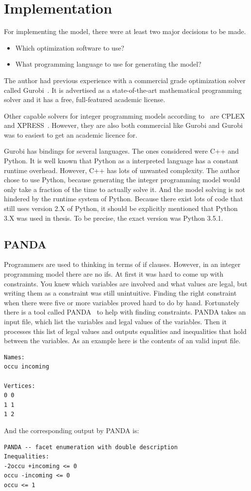 \section{Implementation}
For implementing the model, there were at least two major decisions to be made.
\begin{itemize}
    \item Which optimization software to use?
    \item What programming language to use for generating the model?
\end{itemize}
The author had previous experience with a commercial grade optimization solver
called Gurobi~\cite{gurobi}. It is advertised as a state-of-the-art
mathematical programming solver and it has a free, full-featured academic
license.

Other capable solvers for integer programming models according
to~\cite{meindl2012analysis,mittleman} are CPLEX~\cite{cplex} and XPRESS~\cite{xpress}.
However, they are also both commercial like Gurobi and Gurobi was to easiest to
get an academic licence for.

Gurobi has bindings for several languages. The ones considered were C++ and
Python. It is well known that Python as a interpreted language has a constant
runtime overhead. However, C++ has lots of unwanted complexity. The author
chose to use Python, because generating the integer programming model would
only take a fraction of the time to actually solve it. And the model solving
is not hindered by the runtime system of Python. Because there exist lots of
code that still uses version 2.X of Python, it should be explicitly
mentioned that Python 3.X was used in thesis. To be precise, the exact version
was Python 3.5.1.
\subsection{PANDA}
Programmers are used to thinking in terms of if clauses. However, in an integer
programming model there are no ifs. At first it was hard to come up with
constraints. You knew which variables are involved and what values are legal,
but writing them as a constraint was still unintuitive. Finding the right
constraint when there were five or more variables proved hard to do by
hand. Fortunately there is a tool called PANDA~\cite{panda} to help with
finding constraints.
PANDA takes an input file, which list the variables and legal values of the
variables. Then it processes this list of legal values and outputs equalities and inequalities
that hold between the variables. As an example here is the contents of an valid input file.
\begin{verbatim}
Names:
occu incoming

Vertices:
0 0
1 1
1 2
\end{verbatim}
And the corresponding output by PANDA is:
\begin{verbatim}
PANDA -- facet enumeration with double description
Inequalities:
-2occu +incoming <= 0
occu -incoming <= 0
occu <= 1
\end{verbatim}

